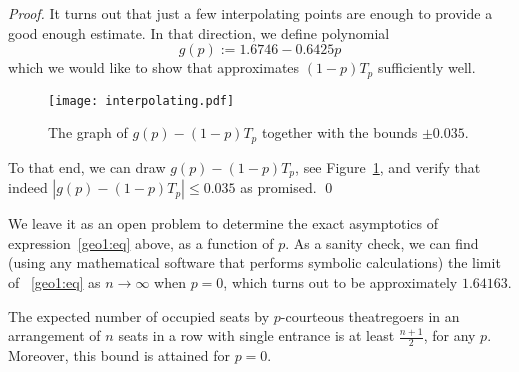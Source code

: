 \documentclass[11pt]{llncs}
\begin{document}
\begin{proof}
It turns out that just a few interpolating points are enough to provide a good enough estimate. In that direction, we define polynomial 
$$
g(p) :=1.6746 -0.6425 p
$$
which we would like to show that approximates $(1-p)T_p$ sufficiently well. 
\begin{figure}[!htb]
\begin{center}
\texttt{[image: interpolating.pdf]}\caption{The graph of $g(p) - (1-p)T_p$ together with the bounds $\pm0.035$.}
\label{fig: interpolation}
\end{center}
\end{figure}
To that end, we can draw $g(p) - (1-p)T_p$, see Figure~\ref{fig: interpolation}, and verify that indeed $\left| g(p) - (1-p)T_p \right|\leq 0.035$ as promised. 
\qed
\end{proof}



We leave it as an open problem to determine the exact asymptotics of expression~\eqref{geo1:eq} above, as a function of $p$. As a sanity check, we can find (using any mathematical software that performs symbolic calculations) the limit of ~\eqref{geo1:eq} as $n\rightarrow \infty$ when $p=0$, which turns out to be approximately $1.64163$. 



\begin{theorem}
\label{thm1geor}
The expected number of occupied seats by $p$-courteous 
theatregoers in an arrangement of $n$ seats
in a row with single entrance is at least $\frac{n+1}{2}$, 
for any $p$. Moreover, this bound is attained for $p=0$.
\end{theorem}
\end{document}

